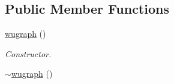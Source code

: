 \subsection*{Public Member Functions}
\begin{DoxyCompactItemize}
\item 
\hyperlink{classlgraph_1_1utils_1_1wugraph_ae50a66b351ad581b460097ef43565cc2}{wugraph} ()\hypertarget{classlgraph_1_1utils_1_1wugraph_ae50a66b351ad581b460097ef43565cc2}{}\label{classlgraph_1_1utils_1_1wugraph_ae50a66b351ad581b460097ef43565cc2}

\begin{DoxyCompactList}\small\item\em Constructor. \end{DoxyCompactList}\item 
\hyperlink{classlgraph_1_1utils_1_1wugraph_a4e6ac08876defdc33d4ed8f5b1826384}{$\sim$wugraph} ()\hypertarget{classlgraph_1_1utils_1_1wugraph_a4e6ac08876defdc33d4ed8f5b1826384}{}\label{classlgraph_1_1utils_1_1wugraph_a4e6ac08876defdc33d4ed8f5b1826384}


\end{DoxyCompactItemize}
